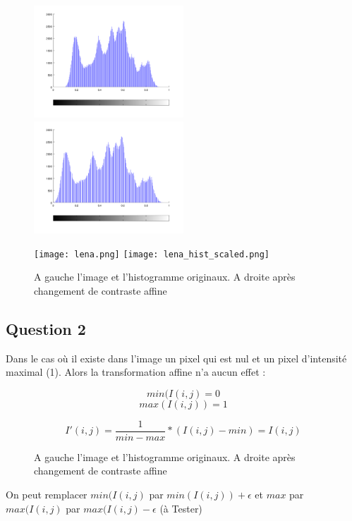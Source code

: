\documentclass{article}
\begin{document}
\begin{figure}[h]

	\includegraphics[width=0.5\textwidth]{hist_orig.png}
	\includegraphics[width=0.5\textwidth]{hist_scaled.png}
		
	\texttt{[image: lena.png]}
	\texttt{[image: lena\_hist\_scaled.png]}
		
	\caption{A gauche l'image et l'histogramme originaux. A droite après changement de contraste affine}
	
\end{figure}

\subsection*{Question 2}

Dans le cas où il existe dans l'image un pixel qui est nul et un pixel d'intensité maximal (1). Alors la transformation affine n'a aucun effet : 


$$min(I(i,j) = 0$$
$$max(I(i,j)) = 1$$
	
$$I'(i,j) = \frac{1}{min-max} * (I(i,j) - min) = I(i,j)$$


\begin{figure}[h]
		
	\caption{A gauche l'image et l'histogramme originaux. A droite après changement de contraste affine}
	
\end{figure}


On peut remplacer $min(I(i,j)$ par $min(I(i,j)) + \epsilon$ et $max$ par $max(I(i,j)$ par $max(I(i,j) - \epsilon$ (à Tester)
\end{document}
